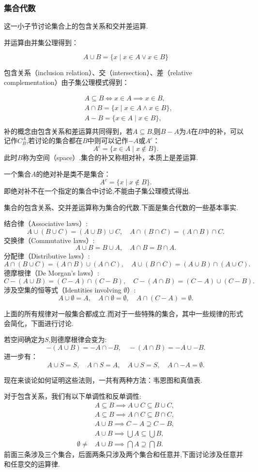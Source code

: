 \subsubsection{集合代数}
这一小子节讨论集合上的包含关系和交并差运算.

并运算由并集公理得到：

\[A\cup B=\{x\mid x\in A\vee x\in B\}\]

包含关系（inclusion relation）、交（intersection）、差（relative complementation）由子集公理模式得到：

\begin{align*}
    &A\subseteq B\iff x\in A\implies x\in B,\\
    &A\cap B=\{x\mid x\in A\wedge x\in B\},\\
    &A-B=\{x\in A\mid x\in B\},\\
\end{align*}
补的概念由包含关系和差运算共同得到，若$A\subseteq B$,则$B-A$为$A$在$B$中的补，可以记作$C_B^A$,若讨论的集合都在$B$中则可以记作$-A$或$A^c$：
\[A^c=\{x\in A\mid x\notin B\}.\]
此时$B$称为空间（space）.集合的补又称相对补，本质上是差运算.

一个集合$A$的绝对补是类不是集合：
\[A^c=\{x\mid x\notin B\}.\]
即绝对补不在一个指定的集合中讨论,不能由子集公理模式得出.

集合的包含关系、交并差运算称为集合的代数.下面是集合代数的一些基本事实.
\begin{proposition}
    [集合代数恒等式]
    结合律（Associative laws）:\[A\cup(B\cup C)=(A\cup B)\cup C,\quad A\cap(B\cap C)=(A\cap B)\cap C.\]
    交换律（Commutative laws）:\[A\cup B=B\cup A,\quad A\cap B=B\cap A.\]
    分配律（Distributive laws）:\[A\cap(B\cup C)=(A\cap B)\cup(A\cap C),\quad A\cup(B\cap C)=(A\cup B)\cap(A\cup C).\]
    德摩根律（De Morgan's laws）:\[C-(A\cup B)=(C-A)\cap(C-B),\quad C-(A\cap B)=(C-A)\cup(C-B).\]
    涉及空集的恒等式（Identities involving $\emptyset$）:\[A\cup\emptyset=A,\quad A\cap\emptyset=\emptyset,\quad A\cap(C-A)=\emptyset.\]
\end{proposition}
上面的所有规律对一般集合都成立.而对于一些特殊的集合，其中一些规律的形式会简化，下面进行讨论.

若空间确定为$S$,则德摩根律会变为:
\[-(A\cup B)=-A\cap -B,\quad -(A\cap B)=-A\cup -B.\]
进一步有：
\[A\cup S=S,\quad A\cap S=A,\quad A\cup S=S,\quad A\cap-A=\emptyset.\]

现在来谈论如何证明这些法则，一共有两种方法：韦恩图和真值表.

对于包含关系，我们有以下单调性和反单调性:
\begin{align*}
    &A\subseteq B\implies A\cup C\subseteq B\cup C,\\
    &A\subseteq B\implies
    A\cap C\subseteq B\cap C,\\
    &A\cup B\implies C-A\supseteq C-B,\\
    &A\cup B\implies \bigcup A\subseteq \bigcup B,\\
    \emptyset\ne &A\cup B\implies\bigcap A\supseteq\bigcap B.
\end{align*}
前面三条涉及三个集合，后面两条只涉及两个集合和任意并,下面讨论涉及任意并和任意交的运算律.

